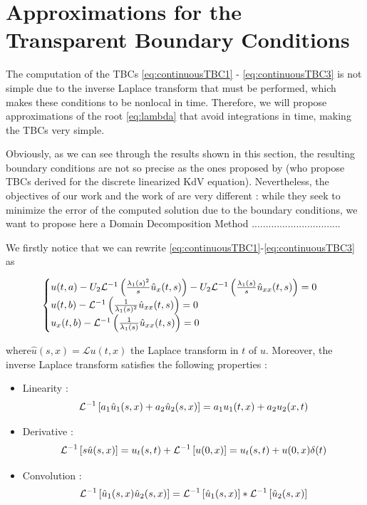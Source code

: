 \section{Approximations for the Transparent Boundary Conditions}

\indent The computation of the TBCs \eqref{eq:continuousTBC1} - \eqref{eq:continuousTBC3} is not simple due to the inverse Laplace transform that must be performed, which makes these conditions to be nonlocal in time. Therefore, we will propose approximations of the root \eqref{eq:lambda} that avoid integrations in time, making the TBCs very simple.

\indent Obviously, as we can see through the results shown in this section, the resulting boundary conditions are not so precise as the ones proposed by \cite{besse2015} (who propose TBCs derived for the discrete linearized KdV equation). Nevertheless, the objectives of our work and the work of \cite{besse2015} are very different : while they seek to minimize the error of the computed solution due to the boundary conditions, we want to propose here a Domain Decomposition Method ................................

\indent We firstly notice that we can rewrite \eqref{eq:continuousTBC1}-\eqref{eq:continuousTBC3} as

\begin{equation}
\label{eq:TBC2}
    \begin{cases}
        u(t,a) - U_2 \mathcal{L}^{-1} \left( \frac{\lambda_1(s)^2}{s} \hat{u}_x(t,s) \right)  - U_2 \mathcal{L}^{-1} \left( \frac{\lambda_1(s)}{s}  \hat{u}_{xx}(t,s) \right) = 0 \\
        u(t,b) - \mathcal{L}^{-1} \left( \frac{1}{\lambda_1(s)^2}   \hat{u}_{xx}(t,s) \right) = 0 \\
        u_x(t,b) - \mathcal{L}^{-1} \left( \frac{1}{\lambda_1(s)}   \hat{u}_{xx}(t,s) \right) = 0 
    \end{cases}
\end{equation}

\noindent where$\hat{u}(s,x) = \mathcal{L}u(t,x)$ the Laplace transform in $t$ of $u$.  Moreover, the inverse Laplace transform satisfies the following properties :

\begin{itemize}
	\item Linearity :
		\begin{equation}
			\label{eq:linearityLaplace}
				\mathcal{L}^{-1} \left[a_1\hat{u}_1(s,x) + a_2\hat{u}_2(s,x)\right] = a_1u_1(t,x) + a_2u_2(x,t)
		\end{equation}
	\item Derivative :
		\begin{equation}
			\label{eq:derivativeLaplace}
			\mathcal{L}^{-1} \left[ s\hat{u}(s,x) \right] = u_t(s,t) + \mathcal{L}^{-1} \left[ u(0,x) \right] =  u_t(s,t) +  u(0,x) \delta (t)
		\end{equation}
	\item Convolution :
	\begin{equation}
		\label{eq:convolutionLaplace}
		\mathcal{L}^{-1} \left[ \hat{u}_1(s,x)\hat{u}_2(s,x)\right] = \mathcal{L}^{-1} \left[ \hat{u}_1(s,x)\right] * \mathcal{L}^{-1} \left[ \hat{u}_2(s,x)\right]
	\end{equation}
\end{itemize} 

